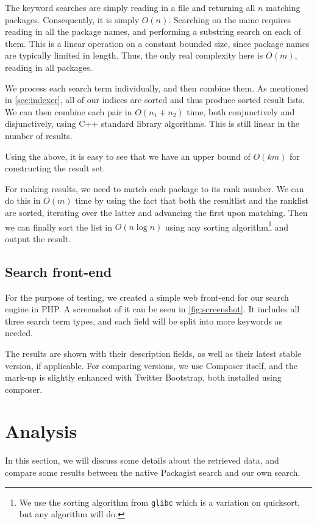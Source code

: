 \documentclass{article}
\begin{document}
The keyword searches are simply reading in a file and returning all $n$ matching packages. Consequently, it is simply $O(n)$. Searching on the name requires reading in all the package names, and performing a substring search on each of them. This is a linear operation on a constant bounded size, since package names are typically limited in length. Thus, the only real complexity here is $O(m)$, reading in all packages.

We process each search term individually, and then combine them. As mentioned in \autoref{sec:indexer}, all of our indices are sorted and thus produce sorted result lists. We can then combine each pair in $O(n_1 + n_2)$ time, both conjunctively and disjunctively, using C++ standard library algorithms. This is still linear in the number of results.

Using the above, it is easy to see that we have an upper bound of $O(km)$ for constructing the result set.

For ranking results, we need to match each package to its rank number. We can do this in $O(m)$ time by using the fact that both the resultlist and the ranklist are sorted, iterating over the latter and advancing the first upon matching. Then we can finally sort the list in $O(n \log n)$ using any sorting algorithm\footnote{We use the sorting algorithm from \texttt{glibc} which is a variation on quicksort, but any algorithm will do.} and output the result.

\subsection{Search front-end}

For the purpose of testing, we created a simple web front-end for our search engine in PHP. A screenshot of it can be seen in \autoref{fig:screenshot}. It includes all three search term types, and each field will be split into more keywords as needed.

The results are shown with their description fields, as well as their latest stable version, if applicable. For comparing versions, we use Composer itself, and the mark-up is slightly enhanced with Twitter Bootstrap, both installed using composer.

\section{Analysis}

In this section, we will discuss some details about the retrieved data, and compare some results between the native Packagist search and our own search.
\end{document}
